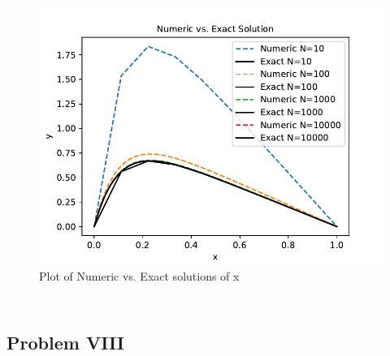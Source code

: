 \documentclass{article}
\begin{document}
\begin{figure}[h]
    \centering 
    \includegraphics[scale=0.75]{Problem 7/Num.vs.Exact_Ns.pdf}%
    \caption{Plot of Numeric vs. Exact solutions of x}
    \label{fig:Numeric vs. Exact Solution}
\end{figure}


\begin{lstlisting}[label= {listing3},language=C++, caption=C++ program]
\end{lstlisting}


\begin{lstlisting}[label= {listing4},language=Python, caption=Python plot script]
\end{lstlisting}

\subsection*{Problem VIII}
\end{document}
